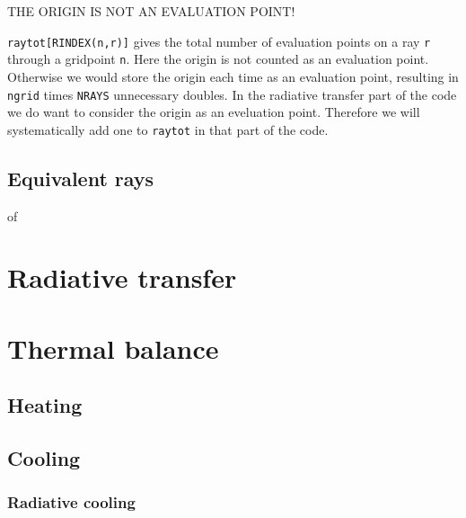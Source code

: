 \documentclass[]{article}
\begin{document}
THE ORIGIN IS NOT AN EVALUATION POINT!

\texttt{raytot[RINDEX(n,r)]} gives the total number of evaluation points on a ray \texttt{r} through a gridpoint \texttt{n}. Here the origin is not counted as an evaluation point. Otherwise we would store the origin each time as an evaluation point, resulting in \texttt{ngrid} times \texttt{NRAYS} unnecessary doubles. In the radiative transfer part of the code we do want to consider the origin as an eveluation point. Therefore we will systematically add one to \texttt{raytot} in that part of the code.

\subsection{Equivalent rays}
of

\section{Radiative transfer}




\section{Thermal balance}

\subsection{Heating}

\subsection{Cooling}

\subsubsection{Radiative cooling}
\end{document}

